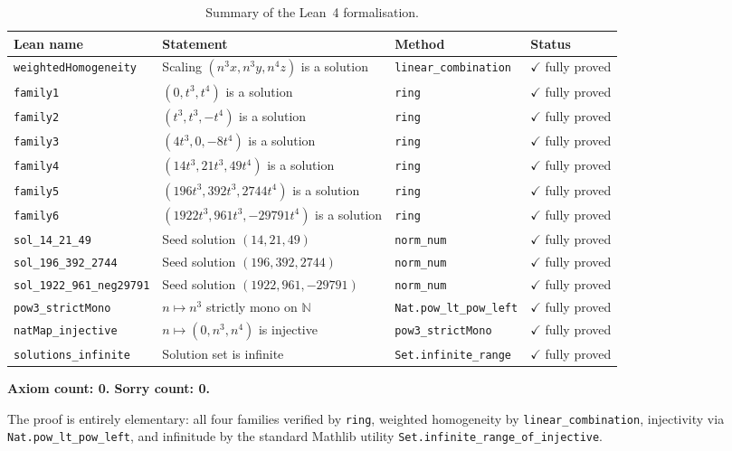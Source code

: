 \documentclass[12pt,a4paper]{article}
\theoremstyle{definition}
\newcommand{\N}{\mathbb{N}}
\begin{document}
\begin{table}[h]
\centering
\caption{Summary of the Lean~4 formalisation.}
\begin{tabular}{@{}llll@{}}
\toprule
Lean name & Statement & Method & Status \\
\midrule
\texttt{weightedHomogeneity} & Scaling $(n^3x, n^3y, n^4z)$ is a solution & \texttt{linear\_combination} & $\checkmark$ fully proved \\
\texttt{family1} & $(0, t^3, t^4)$ is a solution & \texttt{ring} & $\checkmark$ fully proved \\
\texttt{family2} & $(t^3, t^3, -t^4)$ is a solution & \texttt{ring} & $\checkmark$ fully proved \\
\texttt{family3} & $(4t^3, 0, -8t^4)$ is a solution & \texttt{ring} & $\checkmark$ fully proved \\
\texttt{family4} & $(14t^3, 21t^3, 49t^4)$ is a solution & \texttt{ring} & $\checkmark$ fully proved \\
\texttt{family5} & $(196t^3, 392t^3, 2744t^4)$ is a solution & \texttt{ring} & $\checkmark$ fully proved \\
\texttt{family6} & $(1922t^3, 961t^3, -29791t^4)$ is a solution & \texttt{ring} & $\checkmark$ fully proved \\
\texttt{sol\_14\_21\_49} & Seed solution $(14, 21, 49)$ & \texttt{norm\_num} & $\checkmark$ fully proved \\
\texttt{sol\_196\_392\_2744} & Seed solution $(196, 392, 2744)$ & \texttt{norm\_num} & $\checkmark$ fully proved \\
\texttt{sol\_1922\_961\_neg29791} & Seed solution $(1922, 961, -29791)$ & \texttt{norm\_num} & $\checkmark$ fully proved \\
\texttt{pow3\_strictMono} & $n \mapsto n^3$ strictly mono on $\N$ & \texttt{Nat.pow\_lt\_pow\_left} & $\checkmark$ fully proved \\
\texttt{natMap\_injective} & $n \mapsto (0, n^3, n^4)$ is injective & \texttt{pow3\_strictMono} & $\checkmark$ fully proved \\
\texttt{solutions\_infinite} & Solution set is infinite & \texttt{Set.infinite\_range} & $\checkmark$ fully proved \\
\bottomrule
\end{tabular}
\end{table}

\textbf{Axiom count: 0.  Sorry count: 0.}

The proof is entirely elementary: all four families verified by \texttt{ring}, weighted
homogeneity by \texttt{linear\_combination}, injectivity via \texttt{Nat.pow\_lt\_pow\_left},
and infinitude by the standard Mathlib utility
\texttt{Set.infinite\_range\_of\_injective}.
\end{document}
